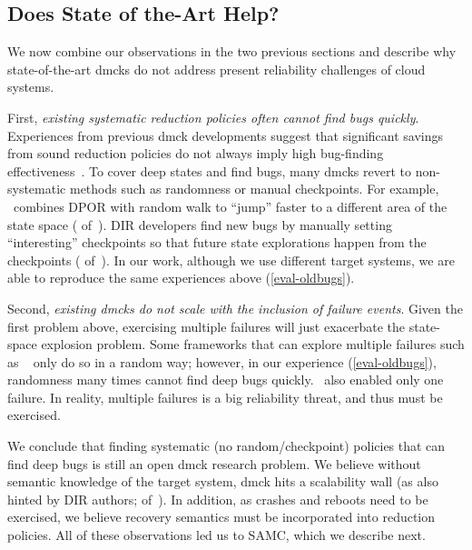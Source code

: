 

\subsection{Does State of the-Art Help?}
\label{mot-summ}

We now combine our observations in the two previous sections and
describe why state-of-the-art dmcks do not address present reliability
challenges of cloud systems.



First, {\em existing systematic reduction policies often cannot find
  bugs quickly}.  Experiences from previous dmck developments suggest
that significant savings from sound reduction policies do not always
imply high bug-finding effectiveness~\cite{Guo+11-Demeter,
  Yang+09-Modist}.  To cover deep states and find bugs, many dmcks
revert to non-systematic methods such as randomness or manual
checkpoints.  For example, \modist\ combines DPOR with random walk to
``jump'' faster to a different area of the state space (
of~\cite{Yang+09-Modist}).  DIR developers find new bugs by manually
setting ``interesting'' checkpoints so that future state explorations
happen from the checkpoints ( of~\cite{Guo+11-Demeter}).  In
our work, although we use different target systems, we are able to
reproduce the same experiences above (\sec\ref{eval-oldbugs}).



Second, {\em existing dmcks do not scale with the inclusion of failure
  events}.  Given the first problem above, exercising multiple
failures will just exacerbate the state-space explosion problem.  Some
frameworks that can explore multiple failures such as
\macemc~\cite{Killian+07-LifeDeathMaceMC} only do so in a random way;
however, in our experience (\sec\ref{eval-oldbugs}), randomness many
times cannot find deep bugs quickly.  \modist\ also enabled only one
failure.  In reality, multiple failures is a big reliability threat,
and thus must be exercised.


We conclude that finding systematic (no random/checkpoint) policies
that can find deep bugs is still an open dmck research problem.  We
believe without semantic knowledge of the target system, dmck hits a
scalability wall (as also hinted by DIR authors; 
of~\cite{Guo+11-Demeter}).  In addition, as crashes and reboots need
to be exercised, we believe recovery semantics must be incorporated into
reduction policies.  All of these observations led us to SAMC, which
we describe next.


